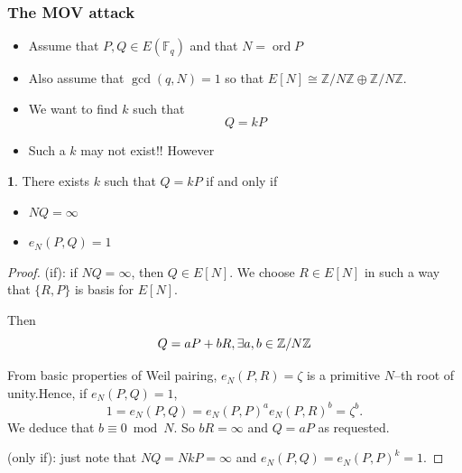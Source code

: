 \documentclass[10pt,handout]{beamer} %
\newcommand{\Z}{\mathbb Z}
\newcommand{\F}{\mathbb F}
\theoremstyle{definition}
\newtheorem{Proposition}[theorem]{\translate{Proposition}}
\begin{document}
\begin{frame}
 \frametitle{The MOV attack}\pause
 \begin{itemize}[<+-| alert@+>]
  \item Assume that $P, Q\in E(\F_q)$ and that $N=\operatorname{ord}P$
  \item Also assume that $\gcd(q,N)=1$ so that $E[N]\cong \Z/N\Z\oplus\Z/N\Z$.
  \item We want to find $k$ such that
  $$Q=kP$$
  \item Such a $k$ may not exist!! However
 \end{itemize}\pause

 \begin{Proposition}
  There exists $k$ such that $Q=kP$ if and only if
  \begin{itemize}
   \item $NQ=\infty$
   \item $e_N(P,Q)=1$
  \end{itemize}
 \end{Proposition}\pause
 
 \begin{proof} (if): if $NQ=\infty$, then $Q\in E[N]$. \pause We choose $R\in E[N]$ in such a way that $\{R,P\}$ is basis for $E[N]$.\pause
 
 Then
 $$Q=a P + b R,\hfill \exists a,b\in\Z/N\Z$$\pause
 
 From basic properties of Weil pairing, $e_N(P,R)=\zeta$ is a primitive $N$--th root of unity.\pause Hence, if $e_N(P,Q)=1$, 
  $$1=e_N(P,Q)=e_N(P,P)^ae_N(P,R)^b=\zeta^b.$$\pause
 We deduce that $b\equiv 0\bmod N$. So $bR=\infty$ and $Q=aP$ as requested.\pause
 
 (only if): just note that $NQ=NkP=\infty$ and $e_N(P,Q)=e_N(P,P)^k=1$.
 \end{proof}
\end{frame}
\end{document}
